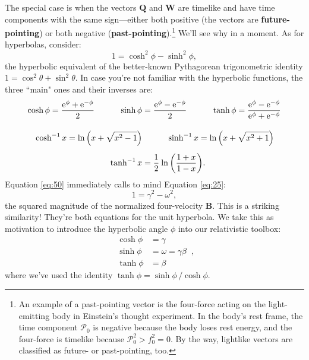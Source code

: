 \documentclass[12pt]{article}
\renewcommand{\vv}[1]{\mathbf{#1}}
\begin{document}
The special case is when the vectors $\vv Q$ and $\vv W$ are timelike and have time components with the same sign---either both positive (the vectors are \textbf{future-pointing}) or both negative (\textbf{past-pointing}).\footnote{\label{fn:nt}An example of a past-pointing vector is the four-force acting on the light-emitting body in Einstein's thought experiment. In the body's rest frame, the time component $\mathcal{P}_0$ is negative because the body loses rest energy, and the four-force is timelike because $\mathcal{P}_0^2 > f_0^2 = 0$. By the way, lightlike vectors are classified as future- or past-pointing, too.} We'll see why in a moment. As for hyperbolas, consider:
\begin{equation}\label{eq:50}
1 = \cosh^2 {\phi} - \sinh^2 {\phi},
\end{equation}
the hyperbolic equivalent of the better-known Pythagorean trigonometric identity $1 = \cos^2 {\theta} + \sin^2 {\theta}$. In case you're not familiar with the hyperbolic functions, the three ``main" ones and their inverses are:
\begin{equation}\label{eq:hf}
\begin{aligned}
\cosh{\phi} = \dfrac{\mathrm{e}^\phi + \mathrm{e}^{-\phi}}{2} \qquad \quad \sinh{\phi} &= \dfrac{\mathrm{e}^\phi - \mathrm{e}^{-\phi}}{2} \qquad \quad \tanh{\phi} = \dfrac{\mathrm{e}^\phi - \mathrm{e}^{-\phi}}{\mathrm{e}^\phi + \mathrm{e}^{-\phi}} \\[10pt]
\cosh^{-1}{x} = \ln{ \left( x + \sqrt{x^2 - 1} \right)} &\qquad \quad \sinh^{-1}{x} = \ln{ \left( x + \sqrt{x^2 + 1} \right)} \\[5pt]
\tanh^{-1}{x} &= \dfrac{1}{2} \mkern1mu \ln{ \left( \dfrac{1 + x}{1 - x} \right) } .
\end{aligned}
\end{equation}
Equation \ref{eq:50} immediately calls to mind Equation \ref{eq:25}:
\begin{equation*}
1 = \gamma^2 - \omega^2 ,
\end{equation*}
the squared magnitude of the normalized four-velocity $\vv B$. This is a striking similarity! They're both equations for the unit hyperbola. We take this as motivation to introduce the hyperbolic angle $\phi$ into our relativistic toolbox:
\begin{equation}\label{eq:51}
\boxed{
\begin{aligned}
\cosh{\phi} &= \gamma \\
\sinh{\phi} &= \omega = \gamma \beta \\
\tanh{\phi} &= \beta
\end{aligned}
} \, ,
\end{equation}
where we've used the identity $\tanh{\phi} = \sinh{\phi} \, / \cosh{\phi}$.
\end{document}
